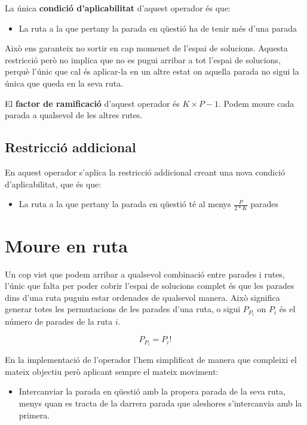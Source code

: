 La única \textbf{condició d'aplicabilitat} d'aquest operador és que:

\begin{itemize}
	\item La ruta a la que pertany la parada en qüestió ha de tenir més d'una parada
\end{itemize}

Això ens garanteix no sortir en cap momenet de l'espai de solucions. Aquesta restricció però no implica que no es pugui arribar a tot l'espai de solucions, perquè l'únic que cal és aplicar-la en un altre estat on aquella parada no sigui la única que queda en la seva ruta.

El \textbf{factor de ramificació} d'aquest operador és $K \times P-1$. Podem moure cada parada a qualsevol de les altres rutes.

\subsection{Restricció addicional} %
\label{sub:restadd}

En aquest operador s'aplica la restricció addicional creant una nova condició d'aplicabilitat, que és que:

\begin{itemize}
	\item La ruta a la que pertany la parada en qüestió té al menys $\frac{P}{2*K}$ parades
\end{itemize}



\section{Moure en ruta} %
\label{sec:moure_en_ruta}

Un cop vist que podem arribar a qualsevol combinació entre parades i rutes, l'únic que falta per poder cobrir l'espai de solucions complet és que les parades dins d'una ruta puguin estar ordenades de qualsevol manera. Això significa generar totes les permutacions de les parades d'una ruta, o sigui $P_{P_i}$ on $P_i$ és el número de parades de la ruta $i$.

\[
	P_{P_i} = P_i!
\]

En la implementació de l'operador l'hem simplificat de manera que compleixi el mateix objectiu però aplicant sempre el mateix moviment:
\begin{itemize}
	\item Intercanviar la parada en qüestió amb la propera parada de la seva ruta, menys quan es tracta de la darrera parada que aleshores s'intercanvia amb la primera.
\end{itemize}

